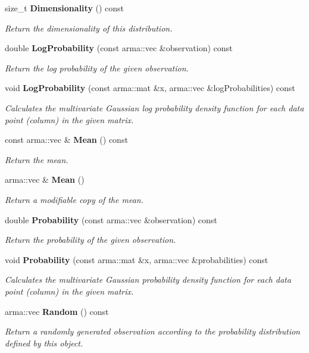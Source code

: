 \begin{DoxyCompactItemize}
\item 
size\+\_\+t {\bf Dimensionality} () const 
\begin{DoxyCompactList}\small\item\em Return the dimensionality of this distribution. \end{DoxyCompactList}\item 
double {\bf Log\+Probability} (const arma\+::vec \&observation) const 
\begin{DoxyCompactList}\small\item\em Return the log probability of the given observation. \end{DoxyCompactList}\item 
void {\bf Log\+Probability} (const arma\+::mat \&x, arma\+::vec \&log\+Probabilities) const 
\begin{DoxyCompactList}\small\item\em Calculates the multivariate Gaussian log probability density function for each data point (column) in the given matrix. \end{DoxyCompactList}\item 
const arma\+::vec \& {\bf Mean} () const 
\begin{DoxyCompactList}\small\item\em Return the mean. \end{DoxyCompactList}\item 
arma\+::vec \& {\bf Mean} ()
\begin{DoxyCompactList}\small\item\em Return a modifiable copy of the mean. \end{DoxyCompactList}\item 
double {\bf Probability} (const arma\+::vec \&observation) const 
\begin{DoxyCompactList}\small\item\em Return the probability of the given observation. \end{DoxyCompactList}\item 
void {\bf Probability} (const arma\+::mat \&x, arma\+::vec \&probabilities) const 
\begin{DoxyCompactList}\small\item\em Calculates the multivariate Gaussian probability density function for each data point (column) in the given matrix. \end{DoxyCompactList}\item 
arma\+::vec {\bf Random} () const 
\begin{DoxyCompactList}\small\item\em Return a randomly generated observation according to the probability distribution defined by this object. \end{DoxyCompactList}\item 

\end{DoxyCompactItemize}
